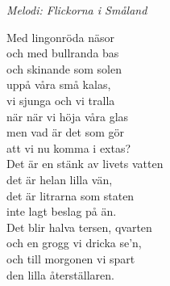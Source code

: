 {\footnotesize\textit{Melodi: Flickorna i Småland}}\par
\vspace{10pt}
Med lingonröda näsor\\
och med bullranda bas\\
och skinande som solen\\
uppå våra små kalas,\\
vi sjunga och vi tralla\\
när när vi höja våra glas\\
men vad är det som gör\\
att vi nu komma i extas?\\
Det är en stänk av livets vatten\\
det är helan lilla vän,\\
det är litrarna som staten\\
inte lagt beslag på än.\\
Det blir halva tersen, qvarten\\
och en grogg vi dricka se'n,\\
och till morgonen vi spart\\
den lilla återställaren.
